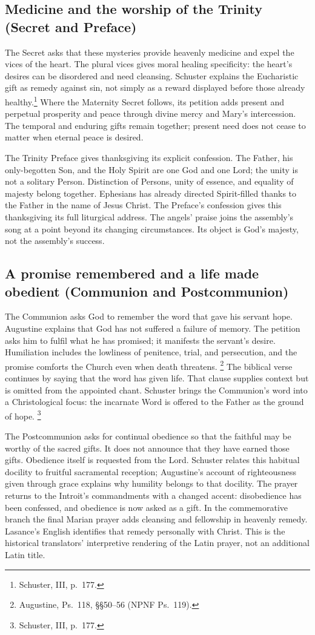\subsection{Medicine and the worship of the Trinity (Secret and Preface)}
The Secret asks that these mysteries provide heavenly medicine and expel
the vices of the heart. The plural vices gives moral healing specificity:
the heart's desires can be disordered and need cleansing. Schuster explains
the Eucharistic gift as remedy against sin, not simply as a reward displayed
before those already healthy.\footnote{Schuster, III, p.~177.}
Where the Maternity Secret follows, its petition adds present and perpetual
prosperity and peace through divine mercy and Mary's intercession. The
temporal and enduring gifts remain together; present need does not cease
to matter when eternal peace is desired.

The Trinity Preface gives thanksgiving its explicit confession. The Father,
his only-begotten Son, and the Holy Spirit are one God and one Lord; the
unity is not a solitary Person. Distinction of Persons, unity of essence,
and equality of majesty belong together. Ephesians has already directed
Spirit-filled thanks to the Father in the name of Jesus Christ. The
Preface's confession gives this thanksgiving its full liturgical address.
The angels' praise joins the assembly's song at a point beyond its changing
circumstances. Its object is God's majesty, not the assembly's success.

\subsection{A promise remembered and a life made obedient (Communion and Postcommunion)}
The Communion asks God to remember the word that gave his servant hope.
Augustine explains that God has not suffered a failure of memory. The
petition asks him to fulfil what he has promised; it manifests the servant's
desire. Humiliation includes the lowliness of penitence, trial, and
persecution, and the promise comforts the Church even when death threatens.
\footnote{Augustine, Ps.~118, \S\S50--56 (NPNF Ps.~119).}
The biblical verse continues by saying that the word has given life.
That clause supplies context but is omitted from the appointed chant.
Schuster brings the Communion's word into a Christological focus: the
incarnate Word is offered to the Father as the ground of hope.
\footnote{Schuster, III, p.~177.}

The Postcommunion asks for continual obedience so that the faithful may
be worthy of the sacred gifts. It does not announce that they have earned
those gifts. Obedience itself is requested from the Lord. Schuster relates
this habitual docility to fruitful sacramental reception; Augustine's
account of righteousness given through grace explains why humility belongs
to that docility. The prayer returns to the Introit's commandments with a
changed accent: disobedience has been confessed, and obedience is now
asked as a gift. In the commemorative branch the final Marian prayer adds
cleansing and fellowship in heavenly remedy. Lasance's English identifies
that remedy personally with Christ. This is the historical translators'
interpretive rendering of the Latin prayer, not an additional Latin title.
